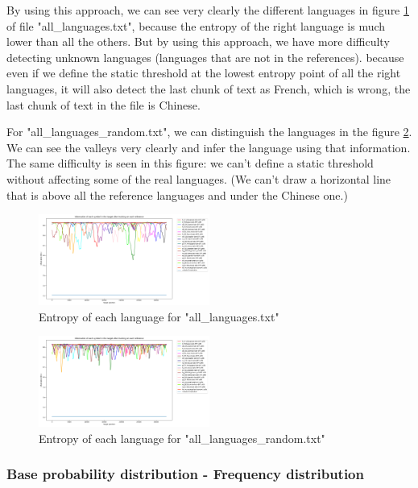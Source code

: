 \documentclass{article}
\begin{document}
By using this approach, we can see very clearly the different languages in figure \ref{fig:all_languages_p_u} of file "all_languages.txt",
because the entropy of the right language is much lower than all the others.
But by using this approach, we have more difficulty detecting unknown languages (languages that are not in the references).
because even if we define the static threshold at the lowest entropy point of all the right languages,
it will also detect the last chunk of text as French, which is wrong, the last chunk of text in the file is Chinese.


For "all_languages_random.txt", we can distinguish the languages in the figure \ref{fig:all_languages_random_p_u}.
We can see the valleys very clearly and infer the language using that information.
The same difficulty is seen in this figure: we can't define a static threshold without affecting some of the real languages.
(We can't draw a horizontal line that is above all the reference languages and under the Chinese one.)

\begin{figure}
    \centering
    \includegraphics[width=0.5\textwidth]{../results/all_languages/-p_u.png}
    \caption{Entropy of each language for "all_languages.txt"}
    \label{fig:all_languages_p_u}
\end{figure}

\begin{figure}
    \centering
    \includegraphics[width=0.5\textwidth]{../results/all_languages_random/-p_u.png}
    \caption{Entropy of each language for "all_languages_random.txt"}
    \label{fig:all_languages_random_p_u}
\end{figure}

\subsubsection{Base probability distribution - Frequency distribution}
\label{subsubsec:results_locate_lang_frequency_distribution}
\end{document}
